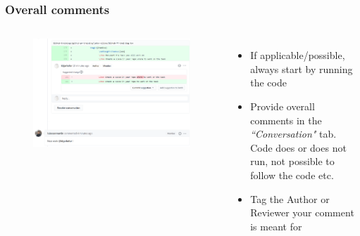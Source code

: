 \documentclass[aspectratio=169]{beamer} %
\begin{document}
\begin{frame}
	\frametitle{Overall comments}
	\begin{columns}[c]
		
		\vspace{-.75cm}
		\begin{figure}
			\centering
			\includegraphics[width=\textwidth]{./img/pr-comment.png}
		\end{figure}
		
		\begin{itemize}
			\setlength\itemsep{1em}
			\item If applicable/possible, always start by running the code
			\item Provide overall comments in the \textit{``Conversation"} tab. Code does or does not run, not possible to follow the code etc.
			\item Tag the Author or Reviewer your comment is meant for
		\end{itemize}
		
	\end{columns}
\end{frame}
\end{document}
